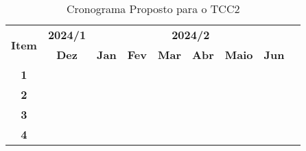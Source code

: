   \setcounter{table}{1}

  \begin{table}[htbp]
    \centering
    \begin{tabular}{|c|c|c|c|c|c|c|c|c|}
      \hline
      \multirow{2}{*}{\textbf{\small{Item}}} & \textbf{\small{2024/1}} & \multicolumn{6}{c|}{\textbf{\small{2024/2}}} \\
      \cline{2-8}
      & \textbf{Dez} & \textbf{Jan} & \textbf{Fev} & \textbf{Mar} & \textbf{Abr} & \textbf{Maio} & \textbf{Jun} \\
      \hline
      \textbf{\small{1}}  & \cellcolor{gray} & \cellcolor{gray} &  &  &  &  & \\
      \hline
      \textbf{\small{2}}  &  & \cellcolor{gray} & \cellcolor{gray} &  &  &  & \\
      \hline
      \textbf{\small{3}}  &  & \cellcolor{gray} & \cellcolor{gray} & \cellcolor{gray} &  &  & \\
      \hline
      \textbf{\small{4}}  &  &  & \cellcolor{gray} & \cellcolor{gray} & \cellcolor{gray} & \cellcolor{gray} & \cellcolor{gray}\\
      \hline
    \end{tabular}
    \caption{Cronograma Proposto para o TCC2}
  \end{table}
